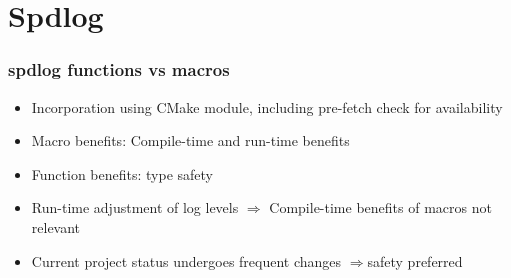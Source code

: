 \section{Spdlog}

\begin{frame}
    \frametitle{spdlog functions vs macros}

    \begin{itemize}
        \item Incorporation using CMake module, including pre-fetch check for availability
        \item Macro benefits: Compile-time and run-time benefits
        \item Function benefits: type safety
        \item Run-time adjustment of log levels $\Rightarrow$ Compile-time benefits of macros not relevant
        \item Current project status undergoes frequent changes $\Rightarrow $safety preferred
    \end{itemize}

\end{frame}